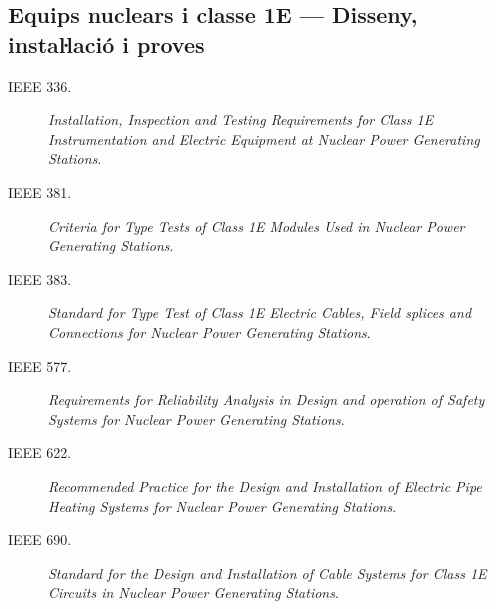 \subsection*{Equips nuclears i classe 1E --- Disseny, instaŀlació i proves}
\begin{description}
	\item [\hspace{5mm}IEEE 336.] \textit{Installation, Inspection and Testing Requirements for Class 1E Instrumentation and Electric Equipment at Nuclear Power Generating Stations}.
	\item [\hspace{5mm}IEEE 381.] \textit{Criteria for Type Tests of Class 1E Modules Used in Nuclear Power Generating Stations}.
	\item [\hspace{5mm}IEEE 383.] \textit{Standard for Type Test of Class 1E Electric Cables, Field splices and Connections for Nuclear Power Generating Stations}.
	\item [\hspace{5mm}IEEE 577.] \textit{Requirements for Reliability Analysis in Design and operation of Safety Systems for Nuclear Power Generating Stations}.
	\item [\hspace{5mm}IEEE 622.] \textit{Recommended Practice for the Design and Installation of Electric Pipe Heating Systems for Nuclear Power Generating Stations}.
	\item [\hspace{5mm}IEEE 690.] \textit{Standard for the Design and Installation of Cable Systems for Class 1E Circuits in Nuclear Power Generating Stations}.
\end{description}


